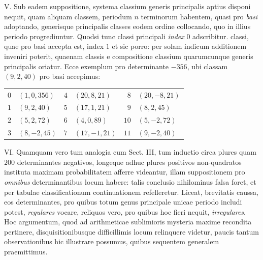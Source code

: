 V. Sub eadem suppositione, systema classium generis principalis aptius disponi nequit, quam aliquam classem, periodum \(n\) terminorum habentem, quasi pro \textit{basi} adoptando, generisque principalis classes eodem ordine collocando, quo in illius periodo progrediuntur. Quodsi tunc classi principali \textit{index} \(0\) adscribitur. classi, quae pro basi accepta est, index \(1\) et sic porro: per solam indicum additionem inveniri poterit, quaenam classis e compositione classium quarumcunque generis principalis oriatur. Ecce exemplum pro determinante \(-356\), ubi classam \((9,2,40)\) pro basi accepimus:
\begin{center}\begin{tabular}{rl|rl|rl}
\(0\) & \((1,0,356)\) & \(4\) & \((20,8,21)\) & \(8\) & \((20,-8,21)\)\\[2pt]
\(1\) & \((9,2,40)\) & \(5\) & \((17,1,21)\) & \(9\) & \((8,2,45)\)\\[2pt]
\(2\) & \((5,2,72)\) & \(6\) & \((4,0,89)\) & \(10\) & \((5,-2,72)\)\\[2pt]
\(3\) & \((8,-2,45)\) & \(7\) & \((17,-1,21)\) & \(11\) & \((9,-2,40)\)\\[2pt]
\end{tabular}\end{center}


VI. Quamquam vero tum analogia cum Sect. III, tum inductio circa plures quam \(200\) determinantes negativos, longeque adhuc plures positivos non-quadratos instituta maximam probabilitatem afferre videantur, illam suppositionem pro \textit{omnibus} determinantibus locum habere: talis conclusio nihilominus falsa foret, et per tabulae classificationum continuationem refelleretur. Liceat, brevitatis caussa, eos determinantes, pro quibus totum genus principale unicae periodo includi potest, \textit{regulares} vocare, reliquos vero, pro quibus hoc fieri nequit, \textit{irregulares}. Hoc argumentum, quod ad arithmeticae sublimioris mysteria maxime recondita pertinere, disquisitionibusque difficillimis locum relinquere videtur, paucis tantum observationibus hic illustrare possumus, quibus sequentem generalem praemittimus.

